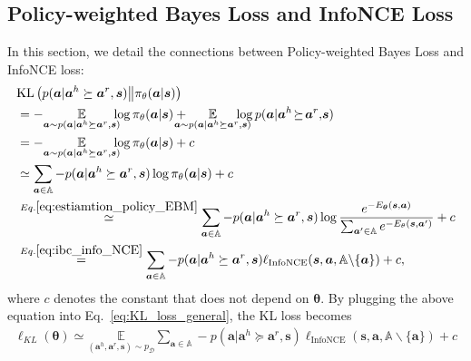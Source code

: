 \subsection{Policy-weighted Bayes Loss and InfoNCE Loss}
\label{appendix:connection_INFONCE}
In this section, we detail the connections between Policy-weighted Bayes Loss and InfoNCE loss:
\begin{align*}
    &\mathrm{KL}\left(p(\bm a|\bm a^h \succeq \bm a^r, \bm s) \big\| \pi_{\theta}(\bm a | \bm s)\right)  \! \\ &= -\underset{\bm a \sim p(\bm a|\bm a^h \succeq \bm a^r, \bm s)}{\mathbb{E}} \!\! \! \!  \log \pi_{\theta}(\bm a | \bm s) + \! \! \! \! \! \! \! \underset{\bm a \sim p(\bm a|\bm a^h \succeq \bm a^r, \bm s)}{\mathbb{E}} \! \!\! \!  \! \! \! \!  \log p(\bm a|\bm a^h \! \succeq\!  \bm a^r, \! \bm s)  \\
    &= -\underset{\bm a \sim p(\bm a|\bm a^h \succeq \bm a^r, \bm s)}{\mathbb{E}} \!\! \! \!  \log \pi_{\theta}(\bm a | \bm s) + c\\
    &\simeq \sum_{\bm a \in \mathbb A} -p (\bm a|\bm a^h \succeq \bm a^r, \bm s) \log \pi_{\theta}(\bm a | \bm s) + c \\
    &\overset{Eq. \eqref{eq:estiamtion_policy_EBM}}{\simeq} \sum_{\bm a \in \mathbb A} -p (\bm a|\bm a^h \succeq \bm a^r, \bm s) \log \frac{e^{-E_{\bm \theta}(\bm s, \bm a)}}{\sum_{\bm a' \in \mathbb A} e^{-E_{\theta}(\bm s, \bm a')}} + c\\
    &\overset{Eq. \eqref{eq:ibc_info_NCE}}{=} \sum_{\bm a \in \mathbb A} -p (\bm a|\bm a^h \succeq \bm a^r, \bm s) \ell_{\text{InfoNCE}}(\bm s, \bm a, \mathbb A \backslash  \{\bm a\}) +c,
\end{align*}
where $c$ denotes the constant that does not depend on $\bm \theta$.
By plugging the above equation into Eq.~\eqref{eq:KL_loss_general},
the KL loss becomes 
\begin{align*}
    \ell_{\!KL}\!(\bm \theta) \!
   \simeq \!\!\!\!
    \!\!\!\! \underset{(\bm{a}^{h}\!, \bm{a}^{r}\!, \bm{s})  \sim p_{\mathcal D}}{\mathbb{E}}\sum_{\bm a \in \mathbb A} \!\! -p (\bm a|\bm a^h \!\succeq \! \bm a^r\!, \bm s) \ell_{\text{InfoNCE}}(\bm s, \bm a, \mathbb A \! \backslash  \!\{\bm a\}) + \!c
\end{align*}

